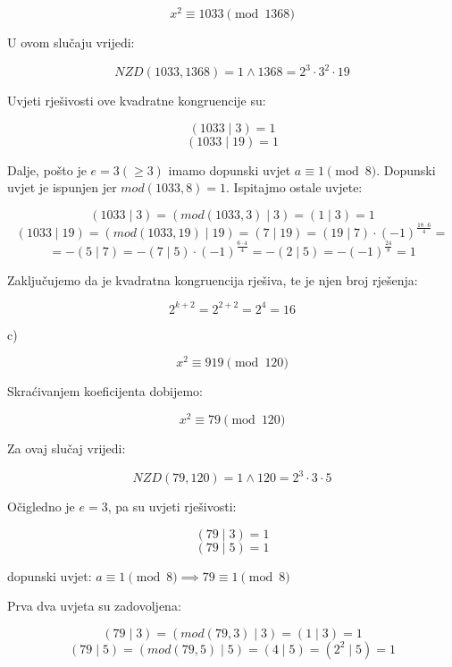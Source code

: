 \documentclass[12pt]{article}
\begin{document}
$$x^2 \equiv 1033 \pmod{1368}$$\vspace{1mm}

U ovom slučaju vrijedi:

$$NZD(1033, 1368) = 1 \land 1368 = 2^3 \cdot 3^2 \cdot 19$$\vspace{1mm}

Uvjeti rješivosti ove kvadratne kongruencije su:

$$(1033 \mid 3) = 1$$
$$(1033 \mid 19) = 1$$\vspace{1mm}

Dalje, pošto je $e = 3 (\geq 3)$ imamo dopunski uvjet $a \equiv 1 \pmod{8}$. Dopunski uvjet je ispunjen jer $mod(1033, 8) = 1$. Ispitajmo ostale uvjete:

$$(1033 \mid 3) = (mod(1033, 3) \mid 3) = (1 \mid 3) = 1$$\vspace{1mm}
$$(1033 \mid 19) = (mod(1033, 19) \mid 19) = (7 \mid 19) = (19 \mid 7) \cdot (-1)^{\frac{18\cdot 6}{4}} =$$
$$= - (5 \mid 7) = - (7 \mid 5) \cdot (-1)^{\frac{6\cdot 4}{4}} = - (2 \mid 5) = - (-1)^{\frac{24}{8}} = 1$$\vspace{1mm}

Zaključujemo da je kvadratna kongruencija rješiva, te je njen broj rješenja:

$$2^{k + 2} = 2^{2 + 2} = 2^4 = 16$$\vspace{1mm}

\newpage

c)

$$x^2 \equiv 919 \pmod{120}$$\vspace{1mm}

Skraćivanjem koeficijenta dobijemo:

$$x^2 \equiv 79 \pmod{120}$$\vspace{1mm}

Za ovaj slučaj vrijedi:

$$NZD(79, 120) = 1 \land 120 = 2^3 \cdot 3 \cdot 5$$\vspace{1mm}

Očigledno je $e = 3$, pa su uvjeti rješivosti:

$$(79 \mid 3) = 1$$
$$(79 \mid 5) = 1$$
\begin{center}
dopunski uvjet: $a \equiv 1 \pmod{8} \implies 79 \equiv 1\pmod{8}$
\end{center}

Prva dva uvjeta su zadovoljena:

$$(79 \mid 3) = (mod(79, 3) \mid 3) = (1 \mid 3) = 1$$
$$(79 \mid 5) = (mod(79, 5) \mid 5) = (4 \mid 5) = (2^2 \mid 5) = 1$$\vspace{1mm}
\end{document}
